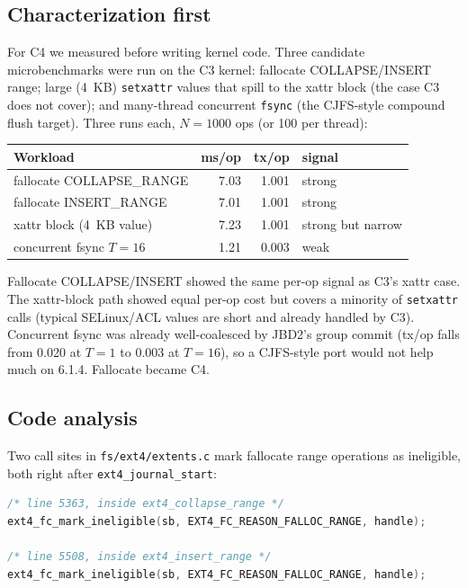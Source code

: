 \documentclass[11pt,a4paper]{article}
\begin{document}
\subsection{Characterization first}

For C4 we measured before writing kernel code. Three candidate
microbenchmarks were run on the C3 kernel: fallocate
COLLAPSE/INSERT range; large (4~KB) \texttt{setxattr} values that
spill to the xattr block (the case C3 does not cover); and
many-thread concurrent \texttt{fsync} (the CJFS-style compound
flush target). Three runs each, $N=1000$ ops (or 100 per thread):

\begin{center}
\begin{tabular}{lrrl}
\toprule
Workload & ms/op & tx/op & signal \\
\midrule
fallocate COLLAPSE\_RANGE & 7.03 & 1.001 & strong \\
fallocate INSERT\_RANGE   & 7.01 & 1.001 & strong \\
xattr block (4~KB value)  & 7.23 & 1.001 & strong but narrow \\
concurrent fsync $T=16$   & 1.21 & 0.003 & weak \\
\bottomrule
\end{tabular}
\end{center}

Fallocate COLLAPSE/INSERT showed the same per-op signal as C3's
xattr case. The xattr-block path showed equal per-op cost but
covers a minority of \texttt{setxattr} calls (typical SELinux/ACL
values are short and already handled by C3). Concurrent fsync was
already well-coalesced by JBD2's group commit
(tx/op falls from 0.020 at $T=1$ to 0.003 at $T=16$), so a
CJFS-style port would not help much on 6.1.4. Fallocate became
C4.

\subsection{Code analysis}

Two call sites in \texttt{fs/ext4/extents.c} mark fallocate
range operations as ineligible, both right after
\texttt{ext4\_journal\_start}:

\begin{lstlisting}[language=C]
/* line 5363, inside ext4_collapse_range */
ext4_fc_mark_ineligible(sb, EXT4_FC_REASON_FALLOC_RANGE, handle);

/* line 5508, inside ext4_insert_range */
ext4_fc_mark_ineligible(sb, EXT4_FC_REASON_FALLOC_RANGE, handle);
\end{lstlisting}
\end{document}
